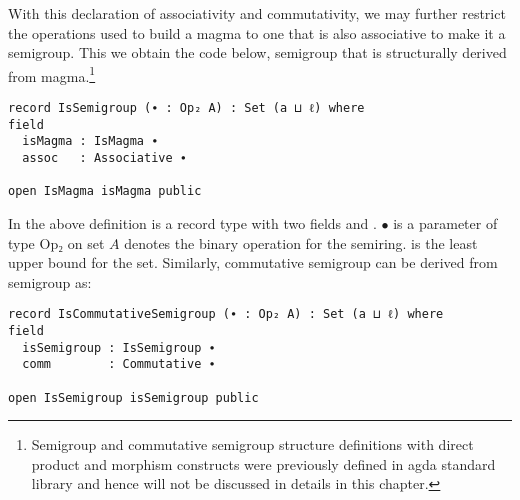 With this declaration of associativity and commutativity, we may further
restrict the operations used to build a magma to one that is also associative to
make it a semigroup. This we obtain the code below, semigroup that is
structurally derived from magma.\footnote{Semigroup and commutative semigroup structure definitions with direct product
and morphism constructs were previously defined in agda standard library and
hence will not be discussed in details in this chapter.}

\begin{verbatim}
record IsSemigroup (∙ : Op₂ A) : Set (a ⊔ ℓ) where
field
  isMagma : IsMagma ∙
  assoc   : Associative ∙

open IsMagma isMagma public
\end{verbatim}
In the above definition  is a record type with two fields
 and . $∙$ is a parameter of type Op₂ on set $A$
denotes the binary operation for the semiring.  is the least upper
bound for the set. Similarly, commutative semigroup can be derived from
semigroup as:
\begin{verbatim}
record IsCommutativeSemigroup (∙ : Op₂ A) : Set (a ⊔ ℓ) where
field
  isSemigroup : IsSemigroup ∙
  comm        : Commutative ∙

open IsSemigroup isSemigroup public
\end{verbatim}

